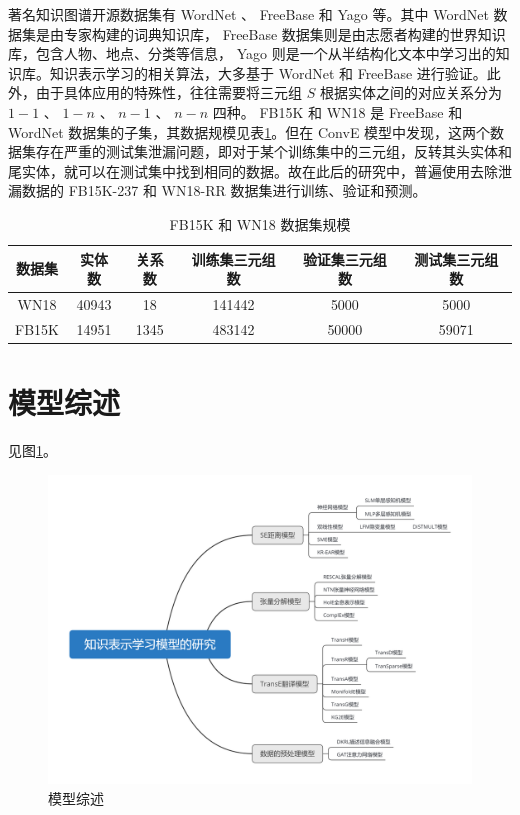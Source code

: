 \documentclass{llncs}
\begin{document}
著名知识图谱开源数据集有 WordNet 、 FreeBase 和 Yago 等。其中 WordNet 数据集是由专家构建的词典知识库， FreeBase 数据集则是由志愿者构建的世界知识库，包含人物、地点、分类等信息， Yago 则是一个从半结构化文本中学习出的知识库。知识表示学习的相关算法，大多基于 WordNet 和 FreeBase 进行验证。此外，由于具体应用的特殊性，往往需要将三元组 $S$ 根据实体之间的对应关系分为 $1-1$ 、 $1-n$ 、 $n-1$ 、 $n-n$ 四种。 FB15K 和 WN18 \cite{DBLP:conf/nips/BordesUGWY13}是 FreeBase 和 WordNet 数据集的子集，其数据规模见表\ref{tb:FB15K&WN18}。但在 ConvE 模型\cite{DBLP:conf/aaai/DettmersMS018}中发现，这两个数据集存在严重的测试集泄漏问题，即对于某个训练集中的三元组，反转其头实体和尾实体，就可以在测试集中找到相同的数据。故在此后的研究中，普遍使用去除泄漏数据的 FB15K-237 和 WN18-RR 数据集进行训练、验证和预测。

\begin{table}
	\centering
	\caption{ FB15K 和 WN18 数据集规模}
	\label{tb:FB15K&WN18}
	\begin{threeparttable}
		\begin{tabular}{cccccc}
			\hline
			\textbf{数据集} & \textbf{实体数} & \textbf{关系数} & \textbf{训练集三元组数} & \textbf{验证集三元组数} & \textbf{测试集三元组数} \\ \hline
			WN18 & 40943 & 18 & 141442 & 5000 & 5000 \\
			FB15K & 14951 & 1345 & 483142 & 50000 & 59071 \\ \hline
		\end{tabular}
	\end{threeparttable}
\end{table}

\section{模型综述}

见图\ref{fg:resume}。

\begin{figure}
	\centering
	\includegraphics[width=1\columnwidth]{figures/resume.png}
	\caption{模型综述}
	\label{fg:resume}
\end{figure}
\end{document}
